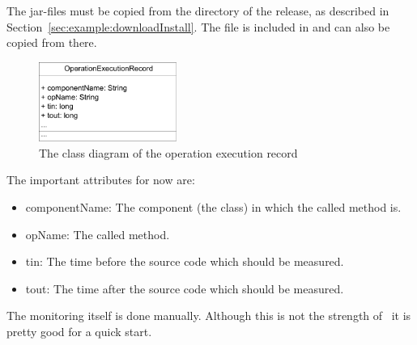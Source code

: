 The \Kieker{} jar-files must be copied from the  directory %
of the \Kieker{} release, as described in Section~\ref{sec:example:downloadInstall}. %
The file  is included in  %
and can also be copied from there.



\begin{figure}[H]
\begin{centering}
\includegraphics[width=0.4\textwidth]{images/OpExRecClassDiagram}
\caption{The class diagram of the operation execution record}
\label{Figure:OperationExecutionRecordClassDiagram}
\end{centering}
\end{figure}

The important attributes for now are:
\begin{itemize}
\item componentName: The component (the class) in which the called method is.
\item opName: The called method.
\item tin: The time before the source code which should be measured.
\item tout: The time after the source code which should be measured.
\end{itemize}

The monitoring itself is done manually. Although this is not the strength of \Kieker\ it is pretty good for a quick start. 

